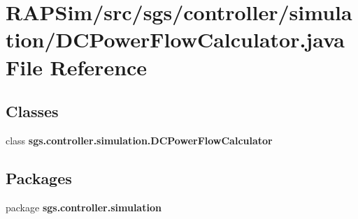 \section{R\-A\-P\-Sim/src/sgs/controller/simulation/\-D\-C\-Power\-Flow\-Calculator.java File Reference}
\label{_d_c_power_flow_calculator_8java}
\subsection*{Classes}
\begin{DoxyCompactItemize}
\item 
class {\bf sgs.\-controller.\-simulation.\-D\-C\-Power\-Flow\-Calculator}
\end{DoxyCompactItemize}
\subsection*{Packages}
\begin{DoxyCompactItemize}
\item 
package {\bf sgs.\-controller.\-simulation}
\end{DoxyCompactItemize}

